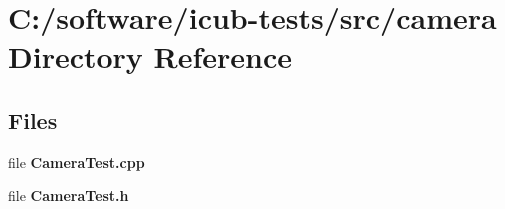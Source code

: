 \section{C\+:/software/icub-\/tests/src/camera Directory Reference}
\label{dir_34519bff5ae72130fe71a8620cbf1fc0}
\subsection*{Files}
\begin{DoxyCompactItemize}
\item 
file {\bfseries Camera\+Test.\+cpp}
\item 
file {\bfseries Camera\+Test.\+h}
\end{DoxyCompactItemize}

